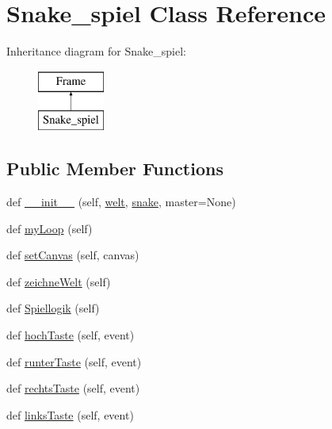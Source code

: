 \hypertarget{class_projekt_01_snake_01auf_01_python_1_1_snake__spiel}{}\section{Snake\+\_\+spiel Class Reference}
\label{class_projekt_01_snake_01auf_01_python_1_1_snake__spiel}
Inheritance diagram for Snake\+\_\+spiel\+:\begin{figure}[H]
\begin{center}
\leavevmode
\includegraphics[height=2.000000cm]{class_projekt_01_snake_01auf_01_python_1_1_snake__spiel}
\end{center}
\end{figure}
\subsection*{Public Member Functions}
\begin{DoxyCompactItemize}
\item 
def \mbox{\hyperlink{class_projekt_01_snake_01auf_01_python_1_1_snake__spiel_a274359678421f70fd2478eaf545418c9}{\+\_\+\+\_\+init\+\_\+\+\_\+}} (self, \mbox{\hyperlink{class_projekt_01_snake_01auf_01_python_1_1_snake__spiel_a80417409ca56d97eabc593c02dbb4a1c}{welt}}, \mbox{\hyperlink{class_projekt_01_snake_01auf_01_python_1_1_snake__spiel_aa798779259654cac04213978cf4297ab}{snake}}, master=None)
\item 
def \mbox{\hyperlink{class_projekt_01_snake_01auf_01_python_1_1_snake__spiel_a12c0e38e91f3d5b7269b68d0503dbe5e}{my\+Loop}} (self)
\item 
def \mbox{\hyperlink{class_projekt_01_snake_01auf_01_python_1_1_snake__spiel_af9674301288092f71d135f9fa85a4f65}{set\+Canvas}} (self, canvas)
\item 
def \mbox{\hyperlink{class_projekt_01_snake_01auf_01_python_1_1_snake__spiel_a5b9f6b3504c29bebfa37aea1bda7067b}{zeichne\+Welt}} (self)
\item 
def \mbox{\hyperlink{class_projekt_01_snake_01auf_01_python_1_1_snake__spiel_acab38f7519e6bdf4ebf69e8514528b14}{Spiellogik}} (self)
\item 
def \mbox{\hyperlink{class_projekt_01_snake_01auf_01_python_1_1_snake__spiel_a76c6e965ba7b947b9cd58531eb5ff7bf}{hoch\+Taste}} (self, event)
\item 
def \mbox{\hyperlink{class_projekt_01_snake_01auf_01_python_1_1_snake__spiel_a6244a07ba822dfec3671bbbc7346cdad}{runter\+Taste}} (self, event)
\item 
def \mbox{\hyperlink{class_projekt_01_snake_01auf_01_python_1_1_snake__spiel_a7aa3b4cbd38ffae3ce5dcdd1ab42fd18}{rechts\+Taste}} (self, event)
\item 
def \mbox{\hyperlink{class_projekt_01_snake_01auf_01_python_1_1_snake__spiel_a3e97fb6a7635f2614e0ea411342e7746}{links\+Taste}} (self, event)
\end{DoxyCompactItemize}
